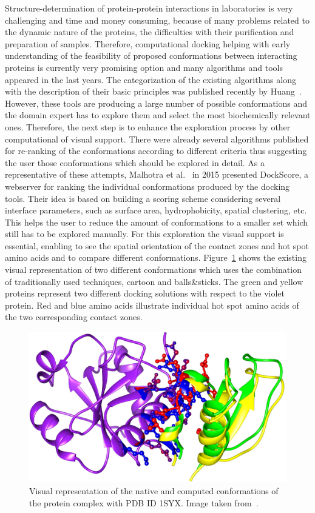 \documentclass[journal]{vgtc}                %
\begin{document}
Structure-determination of protein-protein interactions in laboratories is very challenging and time and money consuming, because of many problems related to the dynamic nature of the proteins, the difficulties with their purification and preparation of samples.
Therefore, computational docking helping with early understanding of the feasibility of proposed conformations between interacting proteins is currently very promising option and many algorithms and tools appeared in the last years.
The categorization of the existing algorithms along with the description of their basic principles was published recently by Huang~\cite{Huang2014}.
However, these tools are producing a large number of possible conformations and the domain expert has to explore them and select the most biochemically relevant ones. 
Therefore, the next step is to enhance the exploration process by other computational of visual support.
There were already several algorithms published for re-ranking of the conformations according to different criteria thus suggesting the user those conformations which should be explored in detail.
As a representative of these attempts, Malhotra et al.~\cite{Malhotra2015} in 2015 presented DockScore, a webserver for ranking the individual conformations produced by the docking tools. 
Their idea is based on building a scoring scheme considering several interface parameters, such as surface area, hydrophobicity, spatial clustering, etc.
This helps the user to reduce the amount of conformations to a smaller set which still has to be explored manually.
For this exploration the visual support is essential, enabling to see the spatial orientation of the contact zones and hot spot amino acids and to compare different conformations.
Figure~\ref{fig:dockscore} shows the existing visual representation of two different conformations which uses the combination of traditionally used techniques, cartoon and balls\&sticks.
The green and yellow proteins represent two different docking solutions with respect to the violet protein. 
Red and blue amino acids illustrate individual hot spot amino acids of the two corresponding contact zones.

\begin{figure}[bt]
  \centering
  \includegraphics[width=0.8\columnwidth]{dockscore.png}
  \caption{Visual representation of the native and computed conformations of the protein complex with PDB ID 1SYX. Image taken from~\cite{Malhotra2015}.}
  \label{fig:dockscore}
\end{figure}
\end{document}

